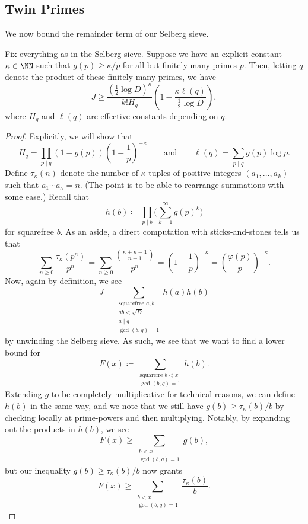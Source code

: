 \documentclass[../notes.tex]{subfiles}
\begin{document}
\subsection{Twin Primes}
We now bound the remainder term of our Selberg sieve.
\begin{theorem}
	Fix everything as in the Selberg sieve. Suppose we have an explicit constant $\kappa\in\NN$ such that $g(p)\ge\kappa/p$ for all but finitely many primes $p$. Then, letting $q$ denote the product of these finitely many primes, we have
	\[J\ge\frac{(\frac12\log D)^\kappa}{k!H_q}\left(1-\frac{\kappa\ell(q)}{\frac12\log D}\right),\]
	where $H_q$ and $\ell(q)$ are effective constants depending on $q$.
\end{theorem}
\begin{proof}
	Explicitly, we will show that
	\[H_q=\prod_{p\mid q}(1-g(p))\left(1-\frac1p\right)^{-\kappa}\qquad\text{and}\qquad\ell(q)=\sum_{p\mid q}g(p)\log p.\]
	Define $\tau_\kappa(n)$ denote the number of $\kappa$-tuples of positive integers $(a_1,\ldots,a_k)$ such that $a_1\cdots a_\kappa=n$. (The point is to be able to rearrange summations with some ease.) Recall that
	\[h(b)\coloneqq\prod_{p\mid b}\Bigg(\sum_{k=1}^\infty g(p)^k\Bigg)\]
	for squarefree $b$. As an aside, a direct computation with sticks-and-stones tells us that
	\begin{equation}
		\sum_{n\ge0}\frac{\tau_\kappa\left(p^n\right)}{p^n}=\sum_{n\ge0}\frac{\binom{\kappa+n-1}{n-1}}{p^n}=\left(1-\frac1p\right)^{-\kappa}=\left(\frac{\varphi(p)}p\right)^{-\kappa}. \label{eq:compare-tau-kappa}
	\end{equation}
	Now, again by definition, we see
	\[J=\sum_{\substack{\text{squarefree }a,b\\ab<\sqrt D\\a\mid q\\\gcd(b,q)=1}}h(a)h(b)\]
	by unwinding the Selberg sieve. As such, we see that we want to find a lower bound for
	\[F(x)\coloneqq\sum_{\substack{\text{squarefre }b<x\\\gcd(b,q)=1}}h(b).\]
	Extending $g$ to be completely multiplicative for technical reasons, we can define $h(b)$ in the same way, and we note that we still have $g(b)\ge\tau_\kappa(b)/b$ by checking locally at prime-powers and then multiplying. Notably, by expanding out the products in $h(b)$, we see
	\[F(x)\ge\sum_{\substack{b<x\\\gcd(b,q)=1}}g(b),\]
	but our inequality $g(b)\ge\tau_\kappa(b)/b$ now grants
	\[F(x)\ge\sum_{\substack{b<x\\\gcd(b,q)=1}}\frac{\tau_\kappa(b)}b.\]

\end{proof}
\end{document}
